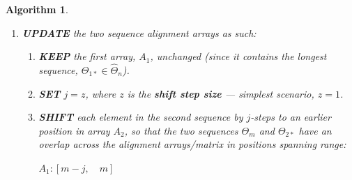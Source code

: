 \documentclass[a4paper, 18pt]{article} %
\newtheorem{alg}{Algorithm}
\newcommand{\invpi}{\rotatebox[origin=c]{180}{$\pi$}}
\begin{document}
\begin{alg}
\begin{enumerate}
{\vspace{1em}
 $A_1: [1, m]$
\vspace{1em}


While $\Theta_{2*}$ occupies positions in the range\footnote{We write ``$\Theta_{2*}[1]$" in our formulation here, to mean the first element in $\Theta_{2*}$ --- i.e. position 1 has value 1, and the nth position has value $n$, not usual (computer-science) $n-1$}:

\vspace{1em}
 $A_2: [(1 + I(\Theta_m[m], A_1)$, $\quad$ $I(\Theta_m[m], A_1) + \invpi(\Theta_{2*})]$
\vspace{1em}

Or, equivalently, the range:

\vspace{1em}
$A_2: [m+1,\quad m + \invpi(\Theta_{2*})]$. 
 \vspace{1em}

Which we can also express visually as:\\\\

\begin{tabular}[H]{|c||c|c|c|c|c|c|c|c|c|c|}
\hline
$A_1$ & $\cdots$ & $a_{1,1}$ & $a_{1,2}$ & $\cdots$ & $a_{1,m}$ & & & & & $\cdots$\\
\hline
$A_2$ & $\cdots$ & & & & & $a_{2,1}$ & $a_{2,2}$ & $\cdots$ & $a_{2,\invpi(\Theta_{2*})}$ & $\cdots$ \\
\hline
 
\end{tabular}\\\\


}
\item{
\textbf{UPDATE}  the two sequence alignment arrays as such:
\begin{enumerate}
\item{
\textbf{KEEP}  the first array, $A_1$, unchanged (since it contains the longest sequence, $\Theta_{1*} \in \hat{\Theta}_n$).
}
\item \textbf{SET}  $j = z$, where $z$ is the \textbf{shift step size} --- simplest scenario, $z = 1$.
\item {\textbf{SHIFT}  each element in the second sequence by $j$-steps to an earlier position in array $A_2$, so that the two sequences $\Theta_m$ and $\Theta_{2*}$ have an overlap across the alignment arrays/matrix in positions spanning range:

\vspace{1em}
 $A_1: [m-j,\quad m]$
\vspace{1em}
 
}
\end{enumerate}}
\end{enumerate}
\end{alg}
\end{document}
